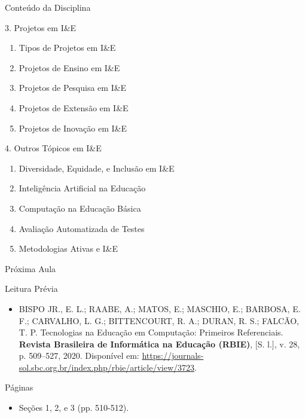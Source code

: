 \documentclass[xcolor=dvipsnames,table]{beamer}
\begin{document}
\begin{frame}[shrink]{Conteúdo da Disciplina}

        \begin{block}{3. Projetos em I\&E}
            \begin{enumerate}
                \item[a)] Tipos de Projetos em I\&E
                \item[b)] Projetos de Ensino em I\&E
                \item[c)] Projetos de Pesquisa em I\&E
                \item[d)] Projetos de Extensão em I\&E
                \item[e)] Projetos de Inovação em I\&E
            \end{enumerate}
            
        \end{block} \pause
        
        \begin{block}{4. Outros Tópicos em I\&E}
            \begin{enumerate}
                \item[a)] Diversidade, Equidade, e Inclusão em I\&E
                \item[b)] Inteligência Artificial na Educação
                \item[c)] Computação na Educação Básica
                \item[d)] Avaliação Automatizada de Testes
                \item[e)] Metodologias Ativas e I\&E
        \end{enumerate}
            
        \end{block}
\end{frame}

\begin{frame}{Próxima Aula}
    \begin{block}{Leitura Prévia}
        \begin{itemize}
            \item BISPO JR., E. L.; RAABE, A.; MATOS, E.; MASCHIO, E.; BARBOSA, E. F.; CARVALHO, L. G.; BITTENCOURT, R. A.; DURAN, R. S.; FALCÃO, T. P. Tecnologias na Educação em Computação: Primeiros Referenciais. \textbf{Revista Brasileira de Informática na Educação (RBIE)}, [S. l.], v. 28, p. 509–527, 2020. Disponível em: \url{https://journals-sol.sbc.org.br/index.php/rbie/article/view/3723}.  
        \end{itemize}
    \end{block}
    \begin{block}{Páginas}
        \begin{itemize}
        \item Seções 1, 2, e 3 (pp. 510-512). 
        \end{itemize}
    \end{block}
\end{frame}
	
	\begin{frame}
		\titlepage
	\end{frame}
	
\end{document}
